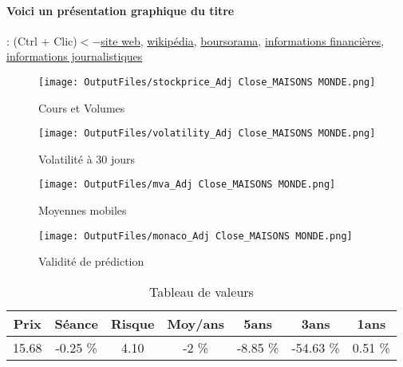 \documentclass[11pt,a4paper]{report}%
\begin{document}
\paragraph{Voici un présentation graphique du titre} : (Ctrl + Clic)$<-$\href{https://corporate.maisonsdumonde.com/fr/finance}{site web}, \href{https://fr.wikipedia.org/wiki/Maisons_du_Monde}{wikipédia}, \href{https://www.boursorama.com/cours/1rPMDM/}{boursorama}, \href{https://www.qwant.com/?q=site:https:%2f%2fwww.easybourse.com%2faction-societe%2fMAISONS-MONDE&t=web&client=ext-firefox-hp}{informations financières}, \href{https://bourse.lerevenu.com/cours-de-bourse/fiche-valeur-synthese/MAISONS-MONDE/MDM-FR}{informations journalistiques}
\begin{figure}[!htb]
   \begin{minipage}{0.5\textwidth}
     \centering
     \texttt{[image: OutputFiles/stockprice\_Adj Close\_MAISONS MONDE.png]}
     \caption{Cours et Volumes}\label{Fig:price_MAISONS MONDE}
   \end{minipage}\hfill
   \begin{minipage}{0.5\textwidth}
     \centering
     \texttt{[image: OutputFiles/volatility\_Adj Close\_MAISONS MONDE.png]}
     \caption{Volatilité à 30 jours}\label{Fig:volat_MAISONS MONDE}
   \end{minipage}
\end{figure}
\begin{figure}[!htb]
   \begin{minipage}{0.5\textwidth}
     \centering
     \texttt{[image: OutputFiles/mva\_Adj Close\_MAISONS MONDE.png]}
     \caption{Moyennes mobiles}\label{Fig:mva_MAISONS MONDE}
   \end{minipage}\hfill
   \begin{minipage}{0.5\textwidth}
     \centering
     \texttt{[image: OutputFiles/monaco\_Adj Close\_MAISONS MONDE.png]}
     \caption{Validité de prédiction}\label{Fig:prediction_MAISONS MONDE}
   \end{minipage}
\end{figure}

\begin{table}[H]
  \centering
    \begin{tabular}{|c|c|c|c|c|c|c|}
    \hline
    Prix & Séance & Risque  & Moy/ans & 5ans & 3ans & 1ans \\
    \hline
    15.68 &    -0.25 \%    & 4.10 & -2 \% & -8.85 \% & -54.63 \% & 0.51 \% \\
    \hline
    \end{tabular}%
        \label{tab:table_MAISONS MONDE}%
      \caption{Tableau de valeurs}
\end{table}%
\end{document}
